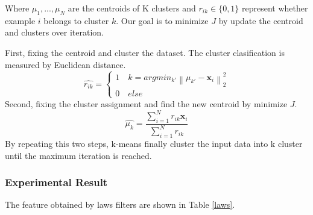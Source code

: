 \documentclass[11pt]{article}
\newcommand{\vct}[1]{\bm{#1}}
\begin{document}
\begin{enumerate}
Where ${ \mu_1,...,\mu_N}$ are the centroids of K clusters and $r_{ik} \in \{0,1\}$ represent whether example $i$ belongs to cluster $k$. Our goal is to minimize $J$ by update the centroid and clusters over iteration. \par
First, fixing the centroid and cluster the dataset. The cluster clasification is measured by Euclidean distance.
\begin{equation}
\hat { r_{ ik } } =\begin{cases} 1\quad k=argmin_{ k' }\left\| \mu _{ k' }-\vct x_{ i } \right\| ^{ 2 }_{ 2 } \\ 0\quad else \end{cases}
\end{equation}
Second, fixing the cluster assignment and find the new centroid by minimize $J$. 
\begin{equation}
\hat { { \mu  }_{ k } } =\frac { \sum _{ i=1 }^{ N }{ { r }_{ ik }{\vct x }_{ i } }  }{ \sum _{ i=1 }^{ N }{ { r }_{ ik } }  } 
\end{equation}
By repeating this two steps, k-means finally cluster the input data into k cluster until the maximum iteration is reached.
\end{enumerate} 
\subsubsection{Experimental Result}
The feature obtained by laws filters are shown in Table \ref{laws}.
\end{document}
